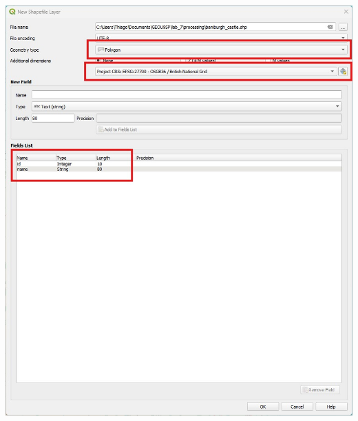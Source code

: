 \documentclass[
  letterpaper,
  DIV=11,
  numbers=noendperiod]{scrreprt}
\begin{document}
\includegraphics{images/lab_8/lab8_fig1_newshape_window.jpg}
\end{document}
